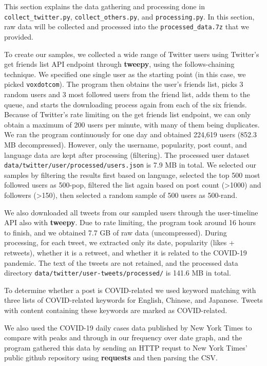 \documentclass{article}
\begin{document}
    This section explains the data gathering and processing done in \verb|collect_twitter.py|, \verb|collect_others.py|, and \verb|processing.py|. In this section, raw data will be collected and processed into the \verb|processed_data.7z| that we provided.

    To create our samples, we collected a wide range of Twitter users using Twitter's get friends list API endpoint through \textbf{tweepy}, using the follows-chaining technique. We specified one single user as the starting point (in this case, we picked \verb|voxdotcom|). The program then obtains the user's friends list, picks 3 random users and 3 most followed users from the friend list, adds them to the queue, and starts the downloading process again from each of the six friends. Because of Twitter's rate limiting on the get friends list endpoint, we can only obtain a maximum of 200 users per minute, with many of them being duplicates. We ran the program continuously for one day and obtained 224,619 users (852.3 MB decompressed). However, only the username, popularity, post count, and language data are kept after processing (filtering). The processed user dataset \verb|data/twitter/user/processed/users.json| is 7.9 MB in total. We selected our samples by filtering the results first based on language, selected the top 500 most followed users as 500-pop, filtered the list again based on post count (>1000) and followers (>150), then selected a random sample of 500 users as 500-rand.

    We also downloaded all tweets from our sampled users through the user-timeline API also with \textbf{tweepy}. Due to rate limiting, the program took around 16 hours to finish, and we obtained 7.7 GB of raw data (uncompressed). During processing, for each tweet, we extracted only its date, popularity (likes + retweets), whether it is a retweet, and whether it is related to the COVID-19 pandemic. The text of the tweets are not retained, and the processed data directory \verb|data/twitter/user-tweets/processed/| is 141.6 MB in total.

    To determine whether a post is COVID-related we used keyword matching with three lists of COVID-related keywords for English, Chinese, and Japanese. Tweets with content containing these keywords are marked as COVID-related.

    We also used the COVID-19 daily cases data published by New York Times to compare with peaks and through in our frequency over date graph, and the program gathered this data by sending an HTTP requst to New York Times' public github repository using \textbf{requests} and then parsing the CSV.
\end{document}
